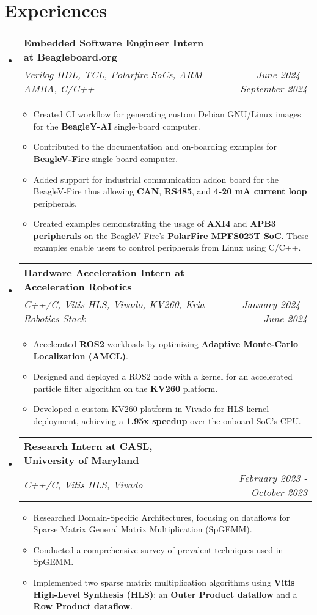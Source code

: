\documentclass[letterpaper,11pt]{article}
\makeatletter
\newcommand{\resumeItem}[1]{
  \item\small{
    {#1 \vspace{-2pt}}
  }
}
\newcommand{\resumeSubheading}[4]{
  \vspace{-2pt}\item
    \begin{tabular*}{1.0\textwidth}[t]{l@{\extracolsep{\fill}}r}
      \textbf{#1} & \textbf{\small #2} \\
      \textit{\small#3} & \textit{\small #4} \\
    \end{tabular*}\vspace{-7pt}
}
\newcommand{\resumeSubHeadingListStart}{\begin{itemize}[leftmargin=0.0in, label={}]}
\newcommand{\resumeSubHeadingListEnd}{\end{itemize}}
\newcommand{\resumeItemListStart}{\begin{itemize}}
\newcommand{\resumeItemListEnd}{\end{itemize}\vspace{-5pt}}
\makeatother
\begin{document}
\section{Experiences}
\resumeSubHeadingListStart
\resumeSubheading
{Embedded Software Engineer Intern at Beagleboard.org \href{https://openbeagle.org/superchamp234}{\faExternalLink}}{}{Verilog HDL, TCL, Polarfire SoCs, ARM AMBA, C/C++}{June 2024 - September 2024}
\resumeItemListStart
\resumeItem{Created CI workflow for generating custom Debian GNU/Linux images for the \textbf{BeagleY-AI} single-board computer.}
\resumeItem{Contributed to the documentation and on-boarding examples for \textbf{BeagleV-Fire} single-board computer.}
\resumeItem{Added support for industrial communication addon board for the BeagleV-Fire thus allowing \textbf{CAN}, \textbf{RS485}, and \textbf{4-20 mA current loop} peripherals.}
\resumeItem{Created examples demonstrating the usage of \textbf{AXI4} and \textbf{APB3 peripherals} on the BeagleV-Fire's \textbf{PolarFire MPFS025T SoC}. These examples enable users to control peripherals from Linux using C/C++.}
\resumeItemListEnd
\resumeSubheading
{Hardware Acceleration Intern at Acceleration Robotics \href{https://drive.google.com/file/d/1zK9jAKZ9oBVwV1-_GcFWSXyqZOX0cpnZ/view?usp=sharing}{\faExternalLink}}{}{C++/C, Vitis HLS, Vivado, KV260, Kria Robotics Stack}{January 2024 - June 2024}
\resumeItemListStart
\resumeItem{Accelerated \textbf{ROS2} workloads by optimizing \textbf{Adaptive Monte-Carlo Localization (AMCL)}.}
\resumeItem{Designed and deployed a ROS2 node with a kernel for an accelerated particle filter algorithm on the \textbf{KV260} platform.}
\resumeItem{Developed a custom KV260 platform in Vivado for HLS kernel deployment, achieving a \textbf{1.95x speedup} over the onboard SoC's CPU.}
\resumeItemListEnd
\resumeSubheading
{Research Intern at CASL, University of Maryland  \href{{https://drive.google.com/drive/folders/19r-r_VaqXl1FvfySPe8bHm7v4QKsKUU0?usp=sharing}}{\faExternalLink}}{}
{C++/C, Vitis HLS, Vivado}{February 2023 - October 2023}
\resumeItemListStart
\resumeItem{Researched Domain-Specific Architectures, focusing on dataflows for Sparse Matrix General Matrix Multiplication (SpGEMM).}
\resumeItem{Conducted a comprehensive survey of prevalent techniques used in SpGEMM.}
\resumeItem{Implemented two sparse matrix multiplication algorithms using \textbf{Vitis High-Level Synthesis (HLS)}: an \textbf{Outer Product dataflow} and a \textbf{Row Product dataflow}.}
\resumeItemListEnd
\resumeSubHeadingListEnd
\end{document}
